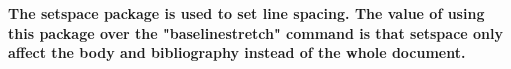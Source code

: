 \documentclass{article}%
\begin{document}

    \textbf{The setspace package is used to set line spacing. The value of using this package over the "baselinestretch" command is that setspace only affect the body and bibliography instead of the whole document.}

    \blindtext
\end{document}
